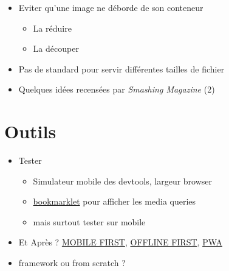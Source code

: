 \begin{itemize}
\tightlist
\item
  Eviter qu'une image ne déborde de son conteneur

  \begin{itemize}
  \tightlist
  \item
    La réduire
  \end{itemize}

  \begin{english}

\begin{Shaded}
\begin{Highlighting}[]
\end{Highlighting}
\end{Shaded}

  \end{english}

  \begin{itemize}
  \tightlist
  \item
    La découper
  \end{itemize}

  \begin{english}

\begin{Shaded}
\begin{Highlighting}[]
\end{Highlighting}
\end{Shaded}

  \end{english}
\item
  Pas de standard pour servir différentes tailles de fichier
\item
  Quelques idées recensées par \emph{Smashing Magazine} (2)
\end{itemize}

\hypertarget{outils}{%
\section{Outils}\label{outils}}

\begin{itemize}
\tightlist
\item
  Tester

  \begin{itemize}
  \tightlist
  \item
    Simulateur mobile des devtools, largeur browser
  \item
    \href{https://seesparkbox.com/foundry/media_query_bookmarklet}{bookmarklet}
    pour afficher les media queries
  \item
    mais surtout tester sur mobile
  \end{itemize}
\item
  Et Après ?
  \href{http://www.lukew.com/resources/mobile_first.asp}{MOBILE FIRST},
  \href{http://offlinefirst.org/}{OFFLINE FIRST},
  \href{https://developers.google.com/web/progressive-web-apps/}{PWA}
\item
  framework ou from scratch ?
\end{itemize}

